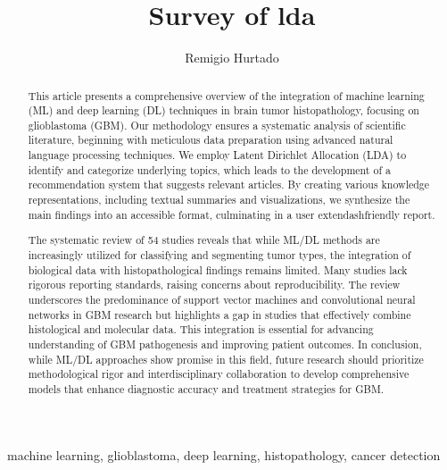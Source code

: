\documentclass[runningheads]{llncs}
\begin{document}
%
\title{Survey of lda}
%
%
\author{Remigio Hurtado}
%
%
%
\maketitle    
%
\begin{abstract}
This article presents a comprehensive overview of the integration of machine learning (ML) and deep learning (DL) techniques in brain tumor histopathology, focusing on glioblastoma (GBM). Our methodology ensures a systematic analysis of scientific literature, beginning with meticulous data preparation using advanced natural language processing techniques. We employ Latent Dirichlet Allocation (LDA) to identify and categorize underlying topics, which leads to the development of a recommendation system that suggests relevant articles. By creating various knowledge representations, including textual summaries and visualizations, we synthesize the main findings into an accessible format, culminating in a user	extendash{}friendly report.

The systematic review of 54 studies reveals that while ML/DL methods are increasingly utilized for classifying and segmenting tumor types, the integration of biological data with histopathological findings remains limited. Many studies lack rigorous reporting standards, raising concerns about reproducibility. The review underscores the predominance of support vector machines and convolutional neural networks in GBM research but highlights a gap in studies that effectively combine histological and molecular data. This integration is essential for advancing understanding of GBM pathogenesis and improving patient outcomes. In conclusion, while ML/DL approaches show promise in this field, future research should prioritize methodological rigor and interdisciplinary collaboration to develop comprehensive models that enhance diagnostic accuracy and treatment strategies for GBM.
\end{abstract}

\begin{keywords}
machine learning, glioblastoma, deep learning, histopathology, cancer detection
\end{keywords}
\end{document}
